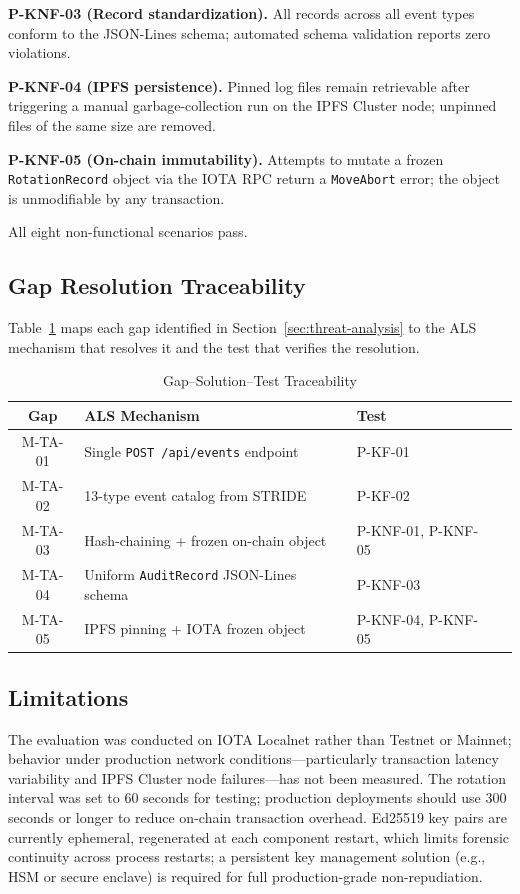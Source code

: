 \textbf{P-KNF-03 (Record standardization).} All records across all event
types conform to the JSON-Lines schema; automated schema validation
reports zero violations.

\textbf{P-KNF-04 (IPFS persistence).} Pinned log files remain retrievable
after triggering a manual garbage-collection run on the IPFS Cluster node;
unpinned files of the same size are removed.

\textbf{P-KNF-05 (On-chain immutability).} Attempts to mutate a frozen
\texttt{RotationRecord} object via the IOTA RPC return a
\texttt{MoveAbort} error; the object is unmodifiable by any transaction.

All eight non-functional scenarios pass.

\subsection{Gap Resolution Traceability}

Table~\ref{tab:traceability} maps each gap identified in
Section~\ref{sec:threat-analysis} to the ALS mechanism that resolves it and
the test that verifies the resolution.

\begin{table}[htbp]
    \caption{Gap--Solution--Test Traceability}
    \label{tab:traceability}
    \begin{center}
        \begin{tabular}{c p{3cm} p{2.5cm} c}
            \toprule
            \textbf{Gap} & \textbf{ALS Mechanism} & \textbf{Test} \\
            \midrule
            M-TA-01 & Single \texttt{POST /api/events} endpoint & P-KF-01 \\
            M-TA-02 & 13-type event catalog from STRIDE & P-KF-02 \\
            M-TA-03 & Hash-chaining + frozen on-chain object & P-KNF-01, P-KNF-05 \\
            M-TA-04 & Uniform \texttt{AuditRecord} JSON-Lines schema & P-KNF-03 \\
            M-TA-05 & IPFS pinning + IOTA frozen object & P-KNF-04, P-KNF-05 \\
            \bottomrule
        \end{tabular}
    \end{center}
\end{table}

\subsection{Limitations}

The evaluation was conducted on IOTA Localnet rather than Testnet or Mainnet;
behavior under production network conditions---particularly transaction
latency variability and IPFS Cluster node failures---has not been measured.
The rotation interval was set to 60 seconds for testing; production
deployments should use 300 seconds or longer to reduce on-chain transaction
overhead. Ed25519 key pairs are currently ephemeral, regenerated at each
component restart, which limits forensic continuity across process restarts;
a persistent key management solution (e.g., HSM or secure enclave) is
required for full production-grade non-repudiation.